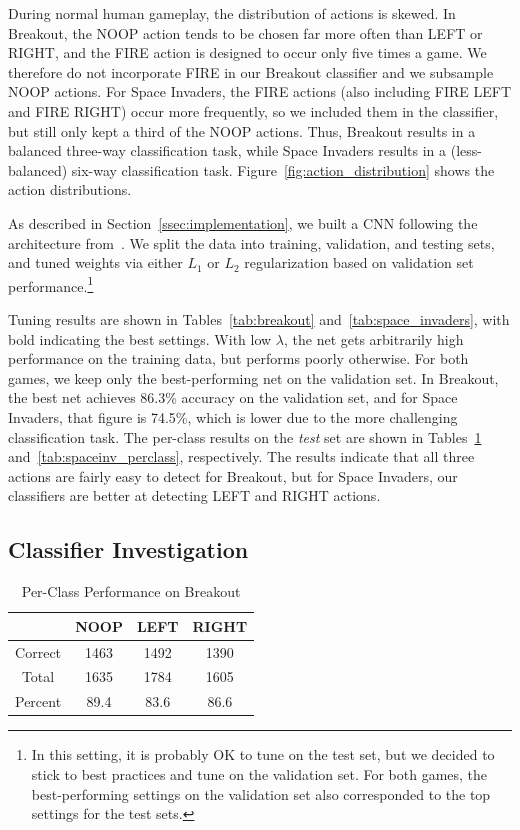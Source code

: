 \documentclass[letterpaper, 10pt, conference]{ieeeconf}
\begin{document}
During normal human gameplay, the distribution of actions is skewed. In
Breakout, the NOOP action tends to be chosen far more often than LEFT or RIGHT,
and the FIRE action is designed to occur only five times a game. We therefore do
not incorporate FIRE in our Breakout classifier and we subsample NOOP actions.
For Space Invaders, the FIRE actions (also including FIRE LEFT and FIRE RIGHT)
occur more frequently, so we included them in the classifier, but still only
kept a third of the NOOP actions.  Thus, Breakout results in a balanced
three-way classification task, while Space Invaders results in a (less-balanced)
six-way classification task.  Figure~\ref{fig:action_distribution} shows the
action distributions.

As described in Section~\ref{ssec:implementation}, we built a CNN following the
architecture from~\cite{mnih-dqn-2015}. We split the data into training,
validation, and testing sets, and tuned weights via either $L_1$ or $L_2$
regularization based on validation set performance.\footnote{In this setting, it
is probably OK to tune on the test set, but we decided to stick to best
practices and tune on the validation set. For both games, the best-performing
settings on the validation set also corresponded to the top settings for the
test sets.}

Tuning results are shown in Tables~\ref{tab:breakout}
and~\ref{tab:space_invaders}, with bold indicating the best settings. With low
$\lambda$, the net gets arbitrarily high performance on the training data, but
performs poorly otherwise. For both games, we keep only the best-performing net
on the validation set. In Breakout, the best net achieves 86.3\% accuracy on the
validation set, and for Space Invaders, that figure is 74.5\%, which is lower
due to the more challenging classification task. The per-class results on the
\emph{test} set are shown in Tables~\ref{tab:breakout_perclass}
and~\ref{tab:spaceinv_perclass}, respectively. The results indicate that all
three actions are fairly easy to detect for Breakout, but for Space Invaders,
our classifiers are better at detecting LEFT and RIGHT actions.

\subsection{Classifier Investigation}

\begin{table}[!t]
\renewcommand{\arraystretch}{1.3}
\caption{Per-Class Performance on Breakout}
\label{tab:breakout_perclass}
\centering
\begin{tabular}{c c c c}
\hline
        & NOOP  & LEFT & RIGHT \\
\hline
Correct & 1463 & 1492 & 1390 \\
Total   & 1635 & 1784 & 1605 \\
Percent & 89.4 & 83.6 & 86.6 \\
\hline
\end{tabular}
\end{table}
\end{document}
